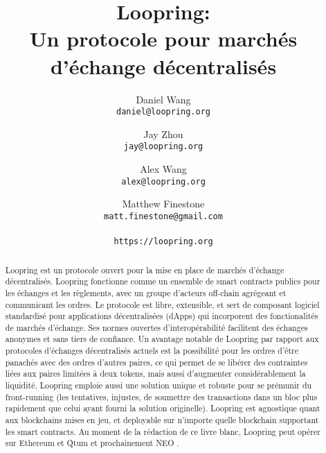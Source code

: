 \documentclass[UTF8,nofonts]{article}
\title{\textbf{Loopring:}\\\textbf{Un protocole pour marchés d'échange décentralisés}}
\author{
  Daniel Wang\\
  \texttt{daniel@loopring.org}\\
  \and
  	Jay Zhou\\
  	\texttt{jay@loopring.org}\\
  	\and
  	Alex Wang\\
  	\texttt{alex@loopring.org}\\
  	\and
  	Matthew Finestone\\
  	\texttt{matt.finestone@gmail.com}\\ 
  \\
  \texttt{https://loopring.org}
 }
\begin{document}
\maketitle


\begin{abstract}
Loopring est un protocole ouvert pour la mise en place de marchés d'échange décentralisés. Loopring fonctionne comme un ensemble de smart contracts publics pour les échanges et les règlements, avec un groupe d'acteurs off-chain agrégeant et communicant les ordres. Le protocole est libre, extensible, et sert de composant logiciel standardisé pour applications décentralisées (dApps) qui incorporent des fonctionalités de marchés d'échange. Ses normes ouvertes d'interopérabilité facilitent des échanges anonymes et sans tiers de confiance. Un avantage notable de Loopring par rapport aux protocoles d'échanges décentralisés actuels est la possibilité pour les ordres d'être panachés avec des ordres d'autres paires, ce qui permet de se libérer des contraintes liées aux paires limitées à deux tokens, mais aussi d'augmenter considérablement la liquidité. Loopring emploie aussi une solution unique et robuste pour se prémunir du front-running (les tentatives, injustes, de soumettre des transactions dans un bloc plus rapidement que celui ayant fourni la solution originelle). Loopring est agnostique quant aux blockchains mises en jeu, et deployable sur n'importe quelle blockchain supportant les smart contracts. Au moment de la rédaction de ce livre blanc, Loopring peut opérer sur Ethereum \cite{buterin2017ethereum} \cite{wood2014ethereum} et Qtum \cite{dai2017smart} et prochainement NEO \cite{atterlonn2018distributed}.
\end{abstract}
\end{document}
